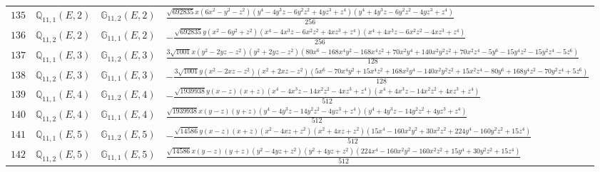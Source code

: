 \documentclass[fleqn,8pt,landscape]{jsarticle}
\begin{document}
\begin{table}[ht!]
\begin{center}
\begin{tabular}{cccl}
$ 135 $ & $ \mathbb{Q}_{11,1}(E,2) $ & $ \mathbb{G}_{11,2}(E,2) $ & $ \frac{\sqrt{692835} x \left(6 x^{2} - y^{2} - z^{2}\right) \left(y^{4} - 4 y^{3} z - 6 y^{2} z^{2} + 4 y z^{3} + z^{4}\right) \left(y^{4} + 4 y^{3} z - 6 y^{2} z^{2} - 4 y z^{3} + z^{4}\right)}{256} $ \\
$ 136 $ & $ \mathbb{Q}_{11,2}(E,2) $ & $ \mathbb{G}_{11,1}(E,2) $ & $ - \frac{\sqrt{692835} y \left(x^{2} - 6 y^{2} + z^{2}\right) \left(x^{4} - 4 x^{3} z - 6 x^{2} z^{2} + 4 x z^{3} + z^{4}\right) \left(x^{4} + 4 x^{3} z - 6 x^{2} z^{2} - 4 x z^{3} + z^{4}\right)}{256} $ \\
$ 137 $ & $ \mathbb{Q}_{11,1}(E,3) $ & $ \mathbb{G}_{11,2}(E,3) $ & $ \frac{3 \sqrt{1001} x \left(y^{2} - 2 y z - z^{2}\right) \left(y^{2} + 2 y z - z^{2}\right) \left(80 x^{6} - 168 x^{4} y^{2} - 168 x^{4} z^{2} + 70 x^{2} y^{4} + 140 x^{2} y^{2} z^{2} + 70 x^{2} z^{4} - 5 y^{6} - 15 y^{4} z^{2} - 15 y^{2} z^{4} - 5 z^{6}\right)}{128} $ \\
$ 138 $ & $ \mathbb{Q}_{11,2}(E,3) $ & $ \mathbb{G}_{11,1}(E,3) $ & $ - \frac{3 \sqrt{1001} y \left(x^{2} - 2 x z - z^{2}\right) \left(x^{2} + 2 x z - z^{2}\right) \left(5 x^{6} - 70 x^{4} y^{2} + 15 x^{4} z^{2} + 168 x^{2} y^{4} - 140 x^{2} y^{2} z^{2} + 15 x^{2} z^{4} - 80 y^{6} + 168 y^{4} z^{2} - 70 y^{2} z^{4} + 5 z^{6}\right)}{128} $ \\
$ 139 $ & $ \mathbb{Q}_{11,1}(E,4) $ & $ \mathbb{G}_{11,2}(E,4) $ & $ - \frac{\sqrt{1939938} y \left(x - z\right) \left(x + z\right) \left(x^{4} - 4 x^{3} z - 14 x^{2} z^{2} - 4 x z^{3} + z^{4}\right) \left(x^{4} + 4 x^{3} z - 14 x^{2} z^{2} + 4 x z^{3} + z^{4}\right)}{512} $ \\
$ 140 $ & $ \mathbb{Q}_{11,2}(E,4) $ & $ \mathbb{G}_{11,1}(E,4) $ & $ \frac{\sqrt{1939938} x \left(y - z\right) \left(y + z\right) \left(y^{4} - 4 y^{3} z - 14 y^{2} z^{2} - 4 y z^{3} + z^{4}\right) \left(y^{4} + 4 y^{3} z - 14 y^{2} z^{2} + 4 y z^{3} + z^{4}\right)}{512} $ \\
$ 141 $ & $ \mathbb{Q}_{11,1}(E,5) $ & $ \mathbb{G}_{11,2}(E,5) $ & $ - \frac{\sqrt{14586} y \left(x - z\right) \left(x + z\right) \left(x^{2} - 4 x z + z^{2}\right) \left(x^{2} + 4 x z + z^{2}\right) \left(15 x^{4} - 160 x^{2} y^{2} + 30 x^{2} z^{2} + 224 y^{4} - 160 y^{2} z^{2} + 15 z^{4}\right)}{512} $ \\
$ 142 $ & $ \mathbb{Q}_{11,2}(E,5) $ & $ \mathbb{G}_{11,1}(E,5) $ & $ \frac{\sqrt{14586} x \left(y - z\right) \left(y + z\right) \left(y^{2} - 4 y z + z^{2}\right) \left(y^{2} + 4 y z + z^{2}\right) \left(224 x^{4} - 160 x^{2} y^{2} - 160 x^{2} z^{2} + 15 y^{4} + 30 y^{2} z^{2} + 15 z^{4}\right)}{512} $ \\

\end{tabular}
\end{center}
\end{table}
\end{document}

